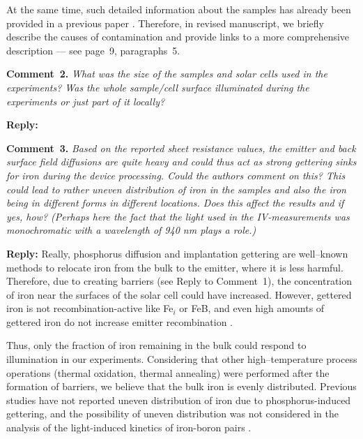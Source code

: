 \documentclass{WileyMSP-template}
\begin{document}
At the same time, such detailed information about the samples has already been provided in a previous paper \cite{Olikh2021JAP}.
Therefore, in revised manuscript, we briefly describe the causes of contamination and provide links
to a more comprehensive description --- see page~9, paragraphs~5.


\vspace{1cm}
\noindent
\textcolor[rgb]{0.00,0.50,1.00}{\textbf{Comment~2.}}
\emph{What was the size of the samples and solar cells used in the experiments?
Was the whole sample/cell surface illuminated during the experiments or just part of it locally?}

\noindent
\textcolor[rgb]{0.51,0.00,0.00}{\textbf{Reply:}}



\vspace{1cm}
\noindent
\textcolor[rgb]{0.00,0.50,1.00}{\textbf{Comment~3.}}
\emph{Based on the reported sheet resistance values,
the emitter and back surface field diffusions are quite heavy and could thus act as strong gettering sinks for iron during the device processing.
Could the authors comment on this?
This could lead to rather uneven distribution of iron in the samples and also the iron being in different forms in different locations.
Does this affect the results and if yes, how?
(Perhaps here the fact that the light used in the IV-measurements was monochromatic with a wavelength of 940 nm plays a role.)}

\noindent
\textcolor[rgb]{0.51,0.00,0.00}{\textbf{Reply:}}
Really, phosphorus diffusion \cite{FeB:Vahanissi} and implantation \cite{LaineIEEEPV2016,FeBKin2019} gettering
are well--known methods to relocate iron from the bulk to the emitter, where it is less harmful.
Therefore, due to creating barriers (see Reply to Comment~1), the concentration of iron near the surfaces of the solar cell could have increased.
However, gettered iron is not recombination-active like
Fe$_i$ or FeB, and even high amounts of gettered iron do not increase emitter recombination \cite{FeB:Vahanissi}.

Thus, only the fraction of iron remaining in the bulk could respond to illumination in our experiments.
Considering that other high--temperature process operations (thermal oxidation, thermal annealing) were performed after the formation of barriers,
we believe that the bulk iron is evenly distributed.
Previous studies have not reported uneven distribution of iron due to phosphorus-induced gettering,
and the possibility of uneven distribution was not considered in the analysis of the light-induced kinetics of iron-boron pairs \cite{LaineIEEEPV2016,FeBKin2019}.
\end{document}
